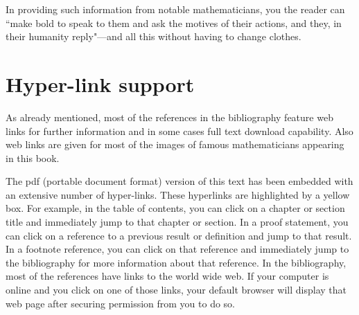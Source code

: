 In providing such information from notable mathematicians, you the reader can
``make bold to speak to them and ask the motives of their actions,
        and they, in their humanity reply"---and all this without having to change clothes.

\section*{Hyper-link support}
As already mentioned, most of the references in the bibliography feature web links
for further information and in some cases full text download capability.
Also web links are given for most of the images of
famous mathematicians appearing in this book.

The pdf (portable document format) version of this text has
been embedded with an extensive number of hyper-links.
These hyperlinks are highlighted by a yellow box.
For example, in the table of contents,
you can click on a chapter or section title and immediately jump to that chapter or section.
In a proof statement, you can click on a reference to a previous result or definition
and jump to that result.
In a footnote reference, you can click on that reference and immediately jump
to the bibliography for more information about that reference.
In the bibliography, most of the references have links to the world wide web.
If your computer is online and you click on one of those links,
your default browser will display that web page after securing permission from you to do so.



